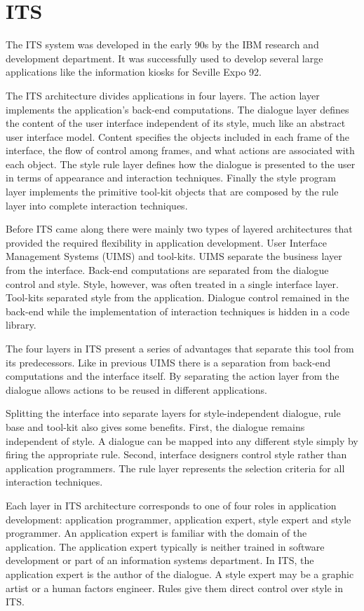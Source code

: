 \section{ITS}
\label{section:ITS}
The ITS\cite{ITS} system was developed in the early 90s by the IBM research and development department. It was successfully used to develop several large applications like the information kiosks for Seville Expo 92.

The ITS architecture divides applications in four layers. The action layer implements the application's back-end computations. The dialogue layer defines the content of the user interface independent of its style, much like an abstract user interface model. Content specifies the objects included in each frame of the interface, the flow of control among frames, and what actions are associated with each object. The style rule layer defines how the dialogue is presented to the user in terms of appearance and interaction techniques. Finally the style program layer implements the primitive tool-kit objects that are composed by the rule layer into complete interaction techniques.

Before ITS came along there were mainly two types of layered architectures that provided the required flexibility in application development. User Interface Management Systems (UIMS) and tool-kits. UIMS separate the business layer from the interface. Back-end computations are separated from the dialogue control and style. Style, however, was often treated in a single interface layer. Tool-kits separated style from the application. Dialogue control remained in the back-end while the implementation of interaction techniques is hidden in a code library.

The four layers in ITS present a series of advantages that separate this tool from its predecessors. Like in previous UIMS there is a separation from back-end computations and the interface itself. By separating the action layer from the dialogue allows actions to be reused in different applications.

Splitting the interface into separate layers for style-independent dialogue, rule base and tool-kit also gives some benefits. First, the dialogue remains independent of style. A dialogue can be mapped into any different style simply by firing the appropriate rule. Second, interface designers control style rather than application programmers. The rule layer represents the selection criteria for all interaction techniques.

Each layer in ITS architecture corresponds to one of four roles in application development: application programmer, application expert, style expert and style programmer. An application expert is familiar with the domain of the application. The application expert typically is neither trained in software development or part of an information systems department. In ITS, the application expert is the author of the dialogue. A style expert may be a graphic artist or a human factors engineer. Rules give them direct control over style in ITS.

